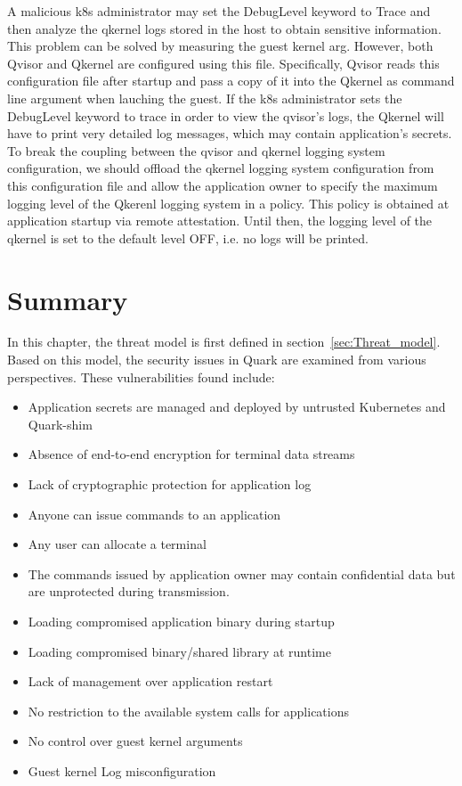 A malicious k8s administrator may set the DebugLevel keyword to Trace and then analyze the qkernel logs stored in the host to obtain sensitive information. 
This problem can be solved by measuring the guest kernel arg. However, both Qvisor and Qkernel are configured using this file. Specifically, Qvisor reads this configuration file after startup and pass a copy of it into the Qkernel as command 
line argument when lauching the guest. If the k8s administrator sets the DebugLevel keyword to trace in order to view the qvisor's logs, the Qkernel will have to print very detailed log messages, which may contain application’s secrets. 
To break the coupling between the qvisor and qkernel logging system configuration, we should offload the qkernel logging system configuration from this configuration file and allow the application owner to specify the maximum logging level of the 
Qkerenl logging system in a policy. This policy is obtained at application startup via remote attestation. Until then, the logging level of the qkernel is set to the default level OFF, i.e. no logs will be printed.



\section{Summary}
In this chapter, the threat model is first defined in section~\ref{sec:Threat_model}. Based on this model, the security issues in Quark are examined from various perspectives. These vulnerabilities found include:
\begin{itemize}
  \item Application secrets are managed and deployed by untrusted Kubernetes and Quark-shim
  \item Absence of end-to-end encryption for terminal data streams
  \item  Lack of cryptographic protection for application log
  \item Anyone can issue commands to an application
  \item Any user can allocate a terminal
  \item The commands issued by application owner may contain confidential data but are unprotected during transmission.
  \item Loading compromised application binary during startup
  \item Loading compromised binary/shared library at runtime
  \item Lack of management over application restart
  \item No restriction to the available system calls for applications
  \item No control over guest kernel arguments
  \item Guest kernel Log misconfiguration

\end{itemize}

\cleardoublepage

